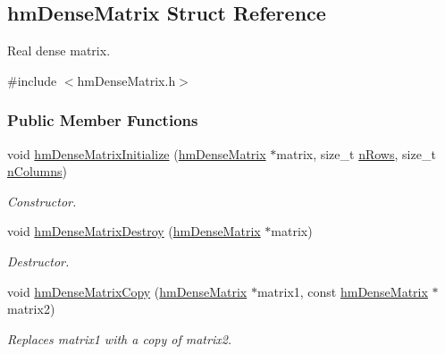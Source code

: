 \hypertarget{structhm_dense_matrix}{\subsection{hm\-Dense\-Matrix Struct Reference}
\label{structhm_dense_matrix}
}


Real dense matrix.  




{\ttfamily \#include $<$hm\-Dense\-Matrix.\-h$>$}

\subsubsection*{Public Member Functions}
\begin{DoxyCompactItemize}
\item 
void \hyperlink{structhm_dense_matrix_ad66d67e9c81627f60987dfa5418ed9b0}{hm\-Dense\-Matrix\-Initialize} (\hyperlink{structhm_dense_matrix}{hm\-Dense\-Matrix} $\ast$matrix, size\-\_\-t \hyperlink{structhm_dense_matrix_a7fbc9f4a4303c885a43e849d118e843f}{n\-Rows}, size\-\_\-t \hyperlink{structhm_dense_matrix_a7078245a8b4311640e4e0d4b231cfedb}{n\-Columns})
\begin{DoxyCompactList}\small\item\em Constructor. \end{DoxyCompactList}\item 
void \hyperlink{structhm_dense_matrix_af57810a94ff9a34a689abf05fd7ac09a}{hm\-Dense\-Matrix\-Destroy} (\hyperlink{structhm_dense_matrix}{hm\-Dense\-Matrix} $\ast$matrix)
\begin{DoxyCompactList}\small\item\em Destructor. \end{DoxyCompactList}\item 
void \hyperlink{structhm_dense_matrix_af0112a828cc38df4a63ff851bf53f4ee}{hm\-Dense\-Matrix\-Copy} (\hyperlink{structhm_dense_matrix}{hm\-Dense\-Matrix} $\ast$matrix1, const \hyperlink{structhm_dense_matrix}{hm\-Dense\-Matrix} $\ast$matrix2)
\begin{DoxyCompactList}\small\item\em Replaces matrix1 with a copy of matrix2. \end{DoxyCompactList}\end{DoxyCompactItemize}
